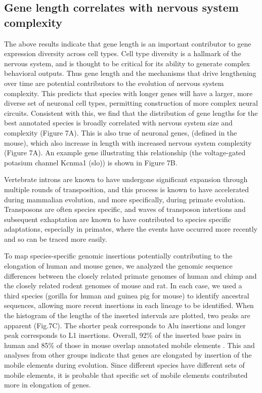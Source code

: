 \subsection{Gene length correlates with nervous system complexity}

The above results indicate that gene length is an important contributor to gene expression diversity across cell types. Cell type diversity is a hallmark of the nervous system, and is thought to be critical for its ability to generate complex behavioral outputs. Thus gene length and the mechanisms that drive lengthening over time are potential contributors to the evolution of nervous system complexity. This predicts that species with longer genes will have a larger, more diverse set of neuronal cell types, permitting construction of more complex neural circuits. Consistent with this, we find that the distribution of gene lengths for the best annotated species is broadly correlated with nervous system size and complexity (Figure 7A). This is also true of neuronal genes, (defined in the mouse), which also increase in length with increased nervous system complexity (Figure 7A). An example gene illustrating this relationship (the voltage-gated potasium channel Kcnma1 (slo)) is shown in Figure 7B. 

Vertebrate introns are known to have undergone significant expansion through multiple rounds of transposition, and this process is known to have accelerated during mammalian evolution, and more specifically, during primate evolution\cite{Friedli_2015}. Transposons are often species specific, and waves of transposon intertions and subsequent exhaptation are known to have contributed to species specific adaptations\cite{Villar_2015}\cite{Mita_2016}\cite{Imbeault_2017}, especially in primates\cite{Ward_2013}\cite{Han_2007}, where the events have occurred more recently and so can be traced more easily. 

To map species-specific genomic insertions potentially contributing to the elongation of human and mouse genes, we analyzed the genomic sequence differences between the closely related primate genomes of human and chimp and the closely related rodent genomes of mouse and rat. In each case, we used a third species (gorilla for human and guinea pig for mouse) to identify ancestral sequences, allowing more recent insertions in each lineage to be identified. When the histogram of the lengths of the inserted intervals are plotted, two peaks are apparent (Fig.7C). The shorter peak corresponds to Alu insertions and longer peak corresponds to L1 insertions. Overall, 92\% of the inserted base pairs in human and 85\% of those in mouse overlap annotated mobile elements \cite{Hubley_2015}. This and analyses from other groups \cite{Grishkevich_2014} indicate that genes are elongated by insertion of the mobile elements during evolution. Since different species have different sets of mobile elements, it is probable that specific set of mobile elements contributed more in elongation of genes.

